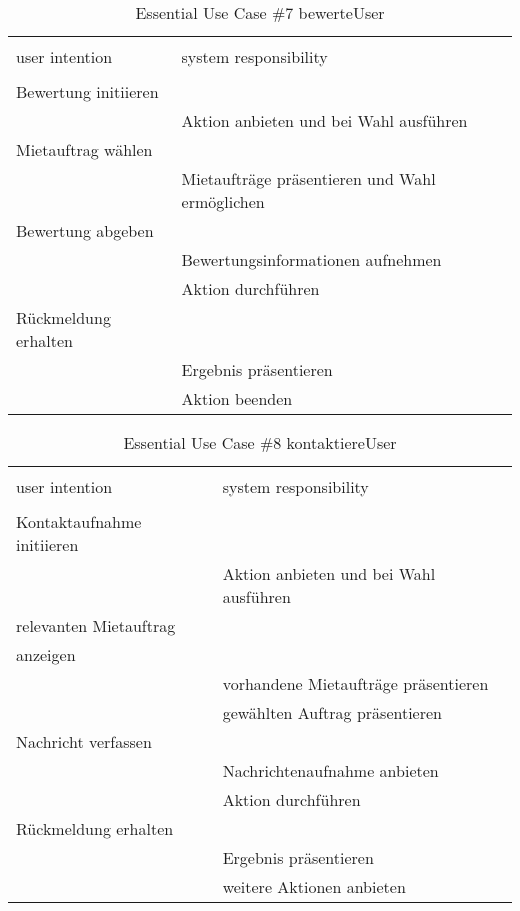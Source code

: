 \begin{table}[H]
\caption{Essential Use Case \#7 bewerteUser }
\centering
\begin{tabular}{l l}
\\ [-0.5ex]

\hline\hline
\\ [-0.5ex]
user intention & system responsibility
\\ [1.5ex]
\hline
\\ [-0.5ex]
Bewertung initiieren	 	& 											 \\[1ex]
							& Aktion anbieten und bei Wahl ausführen	 \\[1ex]
Mietauftrag wählen		  	& 											 \\[1ex] 
							& Mietaufträge präsentieren und Wahl ermöglichen \\[1ex]
Bewertung abgeben    		& 											 \\[1ex]
							& Bewertungsinformationen aufnehmen 		 \\[1ex]
							& Aktion durchführen						 \\[1ex]
Rückmeldung erhalten		&	     									 \\[1ex]
							& Ergebnis präsentieren				   		 \\[1ex]
							& Aktion beenden				    		 \\[1ex]

\hline
\end{tabular}
\label{tab:statuscodes}
\end{table}

\begin{table}[H]
\caption{Essential Use Case \#8 kontaktiereUser }
\centering
\begin{tabular}{l l}
\\ [-0.5ex]

\hline\hline
\\ [-0.5ex]
user intention & system responsibility
\\ [1.5ex]
\hline
\\ [-0.5ex]
Kontaktaufnahme initiieren	& 											 \\[1ex]
							& Aktion anbieten und bei Wahl ausführen	 \\[1ex]
relevanten Mietauftrag    	& 											 \\[1ex] 
anzeigen					& 											 \\[1ex] 
							& vorhandene Mietaufträge präsentieren 		 \\[1ex]
							& gewählten Auftrag präsentieren			 \\[1ex]
Nachricht verfassen			& 											 \\[1ex]
							& Nachrichtenaufnahme anbieten				 \\[1ex]
							& Aktion durchführen			     		 \\[1ex]
Rückmeldung erhalten		&	     									 \\[1ex]
							& Ergebnis präsentieren			    		 \\[1ex]
							& weitere Aktionen anbieten			    	 \\[1ex]


\hline
\end{tabular}
\label{tab:statuscodes}
\end{table}

